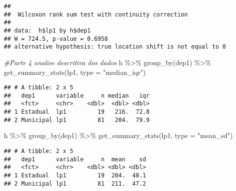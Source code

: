\documentclass[
]{article}
\newenvironment{Shaded}{\begin{snugshade}}{\end{snugshade}}
\newcommand{\AttributeTok}[1]{\textcolor[rgb]{0.77,0.63,0.00}{#1}}
\newcommand{\CommentTok}[1]{\textcolor[rgb]{0.56,0.35,0.01}{\textit{#1}}}
\newcommand{\FunctionTok}[1]{\textcolor[rgb]{0.00,0.00,0.00}{#1}}
\newcommand{\NormalTok}[1]{#1}
\newcommand{\SpecialCharTok}[1]{\textcolor[rgb]{0.00,0.00,0.00}{#1}}
\newcommand{\StringTok}[1]{\textcolor[rgb]{0.31,0.60,0.02}{#1}}
\begin{document}
\begin{verbatim}
## 
##  Wilcoxon rank sum test with continuity correction
## 
## data:  h$lp1 by h$dep1
## W = 724.5, p-value = 0.6958
## alternative hypothesis: true location shift is not equal to 0
\end{verbatim}

\begin{Shaded}
\begin{Highlighting}[]
\CommentTok{\#Parte 4 analise descritiva dos dados}
\NormalTok{h }\SpecialCharTok{\%\textgreater{}\%} \FunctionTok{group\_by}\NormalTok{(dep1) }\SpecialCharTok{\%\textgreater{}\%} 
  \FunctionTok{get\_summary\_stats}\NormalTok{(lp1, }\AttributeTok{type =} \StringTok{"median\_iqr"}\NormalTok{)}
\end{Highlighting}
\end{Shaded}

\begin{verbatim}
## # A tibble: 2 x 5
##   dep1      variable     n median   iqr
##   <fct>     <chr>    <dbl>  <dbl> <dbl>
## 1 Estadual  lp1         19   216.  72.8
## 2 Municipal lp1         81   204.  79.9
\end{verbatim}

\begin{Shaded}
\begin{Highlighting}[]
\NormalTok{h }\SpecialCharTok{\%\textgreater{}\%} \FunctionTok{group\_by}\NormalTok{(dep1) }\SpecialCharTok{\%\textgreater{}\%} 
  \FunctionTok{get\_summary\_stats}\NormalTok{(lp1, }\AttributeTok{type =} \StringTok{"mean\_sd"}\NormalTok{)}
\end{Highlighting}
\end{Shaded}

\begin{verbatim}
## # A tibble: 2 x 5
##   dep1      variable     n  mean    sd
##   <fct>     <chr>    <dbl> <dbl> <dbl>
## 1 Estadual  lp1         19  204.  48.1
## 2 Municipal lp1         81  211.  47.2
\end{verbatim}

\begin{Shaded}
\end{Shaded}
\end{document}
